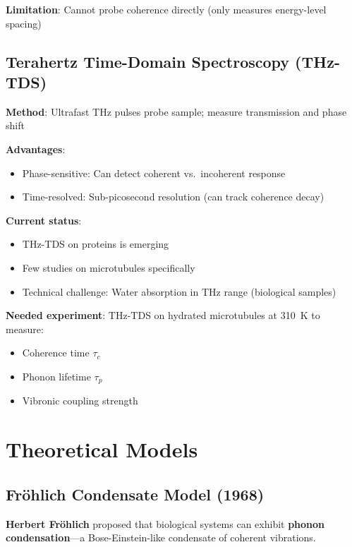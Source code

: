 \textbf{Limitation}: Cannot probe coherence directly (only measures energy-level spacing)

\subsection{Terahertz Time-Domain Spectroscopy (THz-TDS)}\label{terahertz-time-domain-spectroscopy-thz-tds-emerging}

\textbf{Method}: Ultrafast THz pulses probe sample; measure transmission and phase shift

\textbf{Advantages}:
\begin{itemize}
\item Phase-sensitive: Can detect coherent vs.~incoherent response
\item Time-resolved: Sub-picosecond resolution (can track coherence decay)
\end{itemize}

\textbf{Current status}:
\begin{itemize}
\item THz-TDS on proteins is emerging
\item Few studies on microtubules specifically
\item Technical challenge: Water absorption in THz range (biological samples)
\end{itemize}

\textbf{Needed experiment}: THz-TDS on hydrated microtubules at 310~K to measure:
\begin{itemize}
\item Coherence time $\tau_c$
\item Phonon lifetime $\tau_p$
\item Vibronic coupling strength
\end{itemize}



\section{Theoretical Models}\label{theoretical-models}

\subsection{Fröhlich Condensate Model (1968)}\label{fruxf6hlich-condensate-model-1968}

\textbf{Herbert Fröhlich} proposed that biological systems can exhibit \textbf{phonon condensation}---a Bose-Einstein-like condensate of coherent vibrations.

